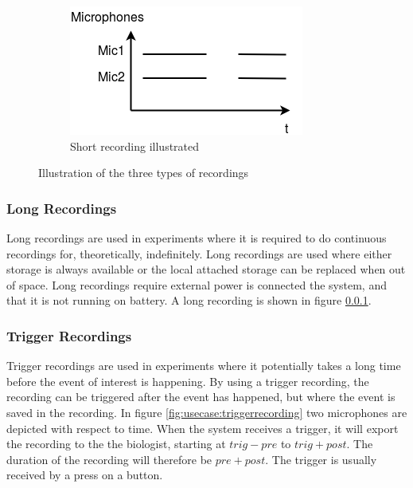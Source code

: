 \begin{figure}[h!]
    \begin{subfigure}[b]{0.3\textwidth}
        \includegraphics[width=\textwidth]{figures/recording_short.png}
        \caption{Short recording illustrated}
        \label{fig:usecase:shortrecording}
    \end{subfigure}
    \caption{Illustration of the three types of recordings}\label{fig:usecase:recordingtypes}
\end{figure}
\subsubsection{Long Recordings}\label{sec:usecase:longrecording}
Long recordings are used in experiments where it is required to do continuous recordings for, theoretically, indefinitely. Long recordings are used where either storage is always available or the local attached storage can be replaced when out of space. Long recordings  require external power is connected the system, and that it is not running on battery. A long recording is shown in figure \ref{sec:usecase:longrecording}.

\subsubsection{Trigger Recordings}\label{sec:usecase:triggerrecording}
Trigger recordings are used in experiments where it potentially takes a long time before the event of interest is happening. By using a trigger recording, the recording can be triggered after the event has happened, but where the event is saved in the recording. In figure \ref{fig:usecase:triggerrecording} two microphones are depicted with respect to time. When the system receives a trigger, it will export the recording to the the biologist, starting at $trig-pre$ to $trig+post$. The duration of the recording will therefore be $pre+post$. The trigger is usually received by a press on a button.

